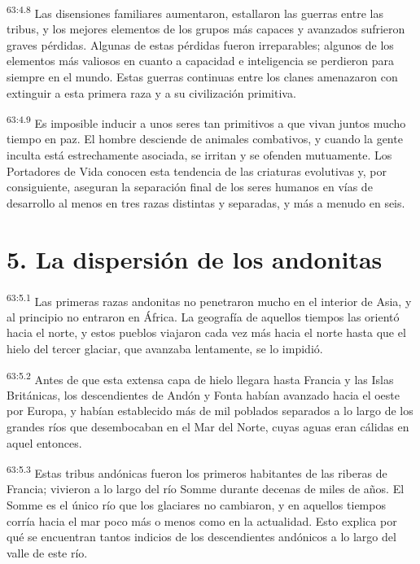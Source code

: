 \par
\textsuperscript{63:4.8} Las disensiones familiares aumentaron, estallaron las guerras entre las tribus, y los mejores elementos de los grupos más capaces y avanzados sufrieron graves pérdidas. Algunas de estas pérdidas fueron irreparables; algunos de los elementos más valiosos en cuanto a capacidad e inteligencia se perdieron para siempre en el mundo. Estas guerras continuas entre los clanes amenazaron con extinguir a esta primera raza y a su civilización primitiva.

\par
\textsuperscript{63:4.9} Es imposible inducir a unos seres tan primitivos a que vivan juntos mucho tiempo en paz. El hombre desciende de animales combativos, y cuando la gente inculta está estrechamente asociada, se irritan y se ofenden mutuamente. Los Portadores de Vida conocen esta tendencia de las criaturas evolutivas y, por consiguiente, aseguran la separación final de los seres humanos en vías de desarrollo al menos en tres razas distintas y separadas, y más a menudo en seis.

\section*{5. La dispersión de los andonitas}
\par
\textsuperscript{63:5.1} Las primeras razas andonitas no penetraron mucho en el interior de Asia, y al principio no entraron en África. La geografía de aquellos tiempos las orientó hacia el norte, y estos pueblos viajaron cada vez más hacia el norte hasta que el hielo del tercer glaciar, que avanzaba lentamente, se lo impidió.

\par
\textsuperscript{63:5.2} Antes de que esta extensa capa de hielo llegara hasta Francia y las Islas Británicas, los descendientes de Andón y Fonta habían avanzado hacia el oeste por Europa, y habían establecido más de mil poblados separados a lo largo de los grandes ríos que desembocaban en el Mar del Norte, cuyas aguas eran cálidas en aquel entonces.

\par
\textsuperscript{63:5.3} Estas tribus andónicas fueron los primeros habitantes de las riberas de Francia; vivieron a lo largo del río Somme durante decenas de miles de años. El Somme es el único río que los glaciares no cambiaron, y en aquellos tiempos corría hacia el mar poco más o menos como en la actualidad. Esto explica por qué se encuentran tantos indicios de los descendientes andónicos a lo largo del valle de este río.

